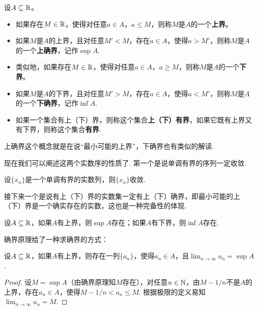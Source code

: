 \begin{definition}
    设$A\subseteq\mathbb{R}$。
\begin{itemize}
    \item 如果存在$M\in\mathbb{R}$，使得对任意$a\in A$，$a\leq M$，则称$M$是$A$的一个\textbf{上界}。
    \item 如果$M$是$A$的上界，且对任意$M'<M$，存在$a\in A$，使得$a>M'$，则称$M$是$A$的一个\textbf{上确界}，记作$\sup A$. 
    \item  类似地，如果存在$M\in\mathbb{R}$，使得对任意$a\in A$，$a\geq M$，则称$M$是$A$的一个\textbf{下界}。
    \item 如果$M$是$A$的下界，且对任意$M'>M$，存在$a\in A$，使得$a<M'$，则称$M$是$A$的一个\textbf{下确界}，记作$\inf A$. 
    \item     如果一个集合有上（下）界，则称这个集合\textbf{上（下）有界}，如果它既有上界又有下界，则称这个集合\textbf{有界}. 
\end{itemize}    
\end{definition}

上确界这个概念就是在说“最小可能的上界”，下确界也有类似的解读. 

现在我们可以阐述这两个实数序的性质了. 第一个是说单调有界的序列一定收敛. 

\begin{proposition}[单调有界原理]\label{prop:monotone-bounded}
    设$\{x_n\}$是一个单调有界的实数列，则$\{x_n\}$收敛. 
\end{proposition}

接下来一个是说有上（下）界的实数集一定有上（下）确界，即最小可能的上（下）界是一个确实存在的实数，这也是一种完备性的体现. 
\begin{proposition}[确界原理]\label{prop:supremum}
    设$A\subseteq\mathbb{R}$，如果$A$有上界，则$\sup A$存在；如果$A$有下界，则$\inf A$存在. 
\end{proposition}

确界原理给了一种求确界的方式：
\begin{proposition}\label{prop:supremum-epsilon}
    设$A\subseteq\mathbb{R}$，如果$A$有上界，则存在一列$\{a_n\}$，使得$a_n\in A$，且$\lim_{n\to\infty}a_n=\sup A$.
\end{proposition}
\begin{proof}
    设$M=\sup A$（由确界原理知$M$存在），对任意$n\in\mathbb{N}$，由$M-1/n$不是$A$的上界，存在$a_n\in A$，使得$M-1/n<a_n\leq M$. 根据极限的定义易知$\lim_{n\to\infty}a_n=M$.
\end{proof}

